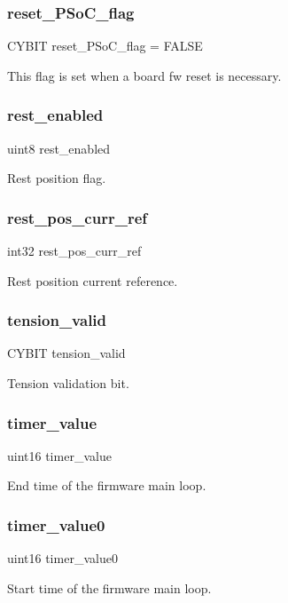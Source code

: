 \subsubsection{reset\+\_\+\+P\+So\+C\+\_\+flag}
{\footnotesize\ttfamily C\+Y\+B\+IT reset\+\_\+\+P\+So\+C\+\_\+flag = F\+A\+L\+SE}

This flag is set when a board fw reset is necessary. \mbox{\label{globals_8c_a1f8839fadee52a47a0042eaa695c3f3a}} 
\subsubsection{rest\+\_\+enabled}
{\footnotesize\ttfamily uint8 rest\+\_\+enabled}

Rest position flag. \mbox{\label{globals_8c_a485e5b90bbfb79aa97f874873cd6c93a}} 
\subsubsection{rest\+\_\+pos\+\_\+curr\+\_\+ref}
{\footnotesize\ttfamily int32 rest\+\_\+pos\+\_\+curr\+\_\+ref}

Rest position current reference. \mbox{\label{globals_8c_ac42fa606610c2600210d9b7b2c1d0882}} 
\subsubsection{tension\+\_\+valid}
{\footnotesize\ttfamily C\+Y\+B\+IT tension\+\_\+valid}

Tension validation bit. \mbox{\label{globals_8c_a2c95347784600e4a45d481b37eeeef4b}} 
\subsubsection{timer\+\_\+value}
{\footnotesize\ttfamily uint16 timer\+\_\+value}

End time of the firmware main loop. \mbox{\label{globals_8c_a82c5883d1d4a600a1073686f917a812d}} 
\subsubsection{timer\+\_\+value0}
{\footnotesize\ttfamily uint16 timer\+\_\+value0}

Start time of the firmware main loop. 